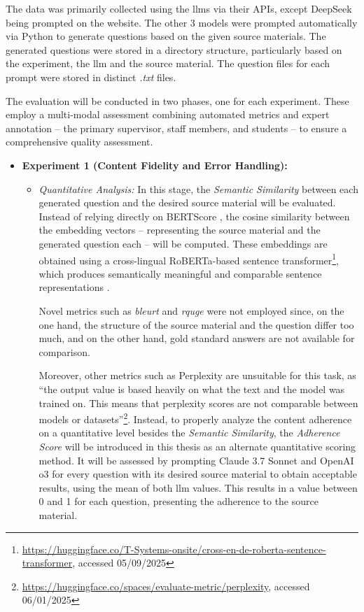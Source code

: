  The data was primarily collected using the \acp{llm} via their APIs, except DeepSeek being prompted on the website. The other 3 models were prompted automatically via Python to generate questions based on the given source materials. The generated questions were stored in a directory structure, particularly based on the experiment, the \ac{llm} and the source material. The question files for each prompt were stored in distinct \textit{.txt} files.

 The evaluation will be conducted in two phases, one for each experiment. These employ a multi-modal assessment combining automated metrics and expert annotation -- the primary supervisor, staff members, and students -- to ensure a comprehensive quality assessment.

\begin{itemize}
    \item \textbf{Experiment 1 (Content Fidelity and Error Handling):}
    \begin{itemize}
        \item \textit{Quantitative Analysis:} In this stage, the \textit{Semantic Similarity} between each generated question and the desired source material will be evaluated. Instead of relying directly on BERTScore \cite{zhang_bertscore_2020}, the cosine similarity between the embedding vectors -- representing the source material and the generated question each -- will be computed. These embeddings are obtained using a cross-lingual RoBERTa-based sentence transformer\footnote{\label{fn:roberta-st}\url{https://huggingface.co/T-Systems-onsite/cross-en-de-roberta-sentence-transformer}, accessed 05/09/2025}, which produces semantically meaningful and comparable sentence representations \cite{reimers_sentence-bert_2019}.
        
        Novel metrics such as \textit{\ac{bleurt}} and \textit{\ac{rquge}} were not employed since, on the one hand, the structure of the source material and the question differ too much, and on the other hand, gold standard answers are not available for comparison.

        Moreover, other metrics such as Perplexity are unsuitable for this task, as \enquote{the output value is based heavily on what the text and the model was trained on. This means that perplexity scores are not comparable between models or datasets}\footnote{\url{https://huggingface.co/spaces/evaluate-metric/perplexity}, accessed 06/01/2025}. Instead, to properly analyze the content adherence on a quantitative level besides the \textit{Semantic Similarity}, the \textit{Adherence Score} will be introduced in this thesis as an alternate quantitative scoring method. It will be assessed by prompting Claude 3.7 Sonnet and OpenAI o3 for every question with its desired source material to obtain acceptable results, using the mean of both \ac{llm} values. This results in a value between 0 and 1 for each question, presenting the adherence to the source material.


\end{itemize}
\end{itemize}
